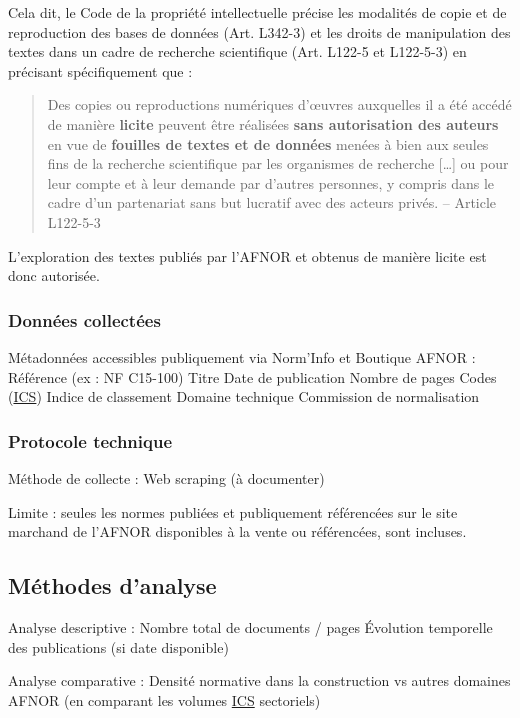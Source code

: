 \documentclass[a4paper,12pt]{article}
\begin{document}
Cela dit, le Code de la propriété intellectuelle précise les modalités de copie et de reproduction des bases de données (Art. L342-3) et les droits de manipulation des textes dans un cadre de recherche scientifique (Art. L122-5 et L122-5-3)\autocite{CodeProprieteIntellectuelle} en précisant spécifiquement que :
\begin{quote}
Des copies ou reproductions numériques d'œuvres auxquelles il a été accédé de manière \textbf{licite} peuvent être réalisées \textbf{sans autorisation des auteurs} en vue de \textbf{fouilles de textes et de données} menées à bien aux seules fins de la recherche scientifique par les organismes de recherche [\ldots{}] ou pour leur compte et à leur demande par d'autres personnes, y compris dans le cadre d'un partenariat sans but lucratif avec des acteurs privés. -- Article L122-5-3\autocite{CodeProprieteIntellectuelle}
\end{quote}

L'exploration des textes publiés par l'AFNOR et obtenus de manière licite est donc autorisée.
\subsubsection{Données collectées}
\label{sec:orgc401e10}
Métadonnées accessibles publiquement via Norm’Info et Boutique AFNOR :
    Référence (ex : NF C15-100)
    Titre
    Date de publication
    Nombre de pages
    Codes  (\protect\hyperlink{gls-5}{\label{gls-5-use-1}ICS})
    Indice de classement
    Domaine technique
    Commission de normalisation
\subsubsection{Protocole technique}
\label{sec:orgcdaefe4}
Méthode de collecte : Web scraping (à documenter)

Limite : seules les normes publiées et publiquement référencées sur le site marchand de l'AFNOR disponibles à la vente ou référencées, sont incluses.
\subsection{Méthodes d'analyse}
\label{sec:orgb01a28a}
Analyse descriptive :
    Nombre total de documents / pages
    Évolution temporelle des publications (si date disponible)

Analyse comparative :
    Densité normative dans la construction vs autres domaines AFNOR (en comparant les volumes \protect\hyperlink{gls-5}{\label{gls-5-use-2}ICS} sectoriels)
\end{document}
